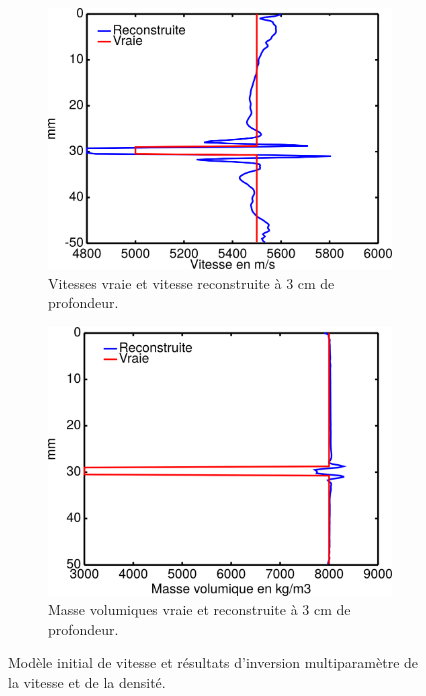 \begin{figure}[!h]
\begin{subfigure}[b]{0.35\textwidth}
		\includegraphics[width=\textwidth]{img/multi_param/coupe_vp_multi_vert.png}
		\caption{Vitesses vraie et vitesse reconstruite à 3 cm de profondeur.}
	\end{subfigure}
	\begin{subfigure}[b]{0.35\textwidth}
		\includegraphics[width=\textwidth]{img/multi_param/coupe_rho_multi_vert.png}
		\caption{Masse volumiques vraie et reconstruite à 3 cm de profondeur.}
	\end{subfigure}
	\caption{Modèle initial de vitesse et résultats d'inversion multiparamètre de la vitesse et de la densité.\label{app:inv_multi} }
\end{figure}


